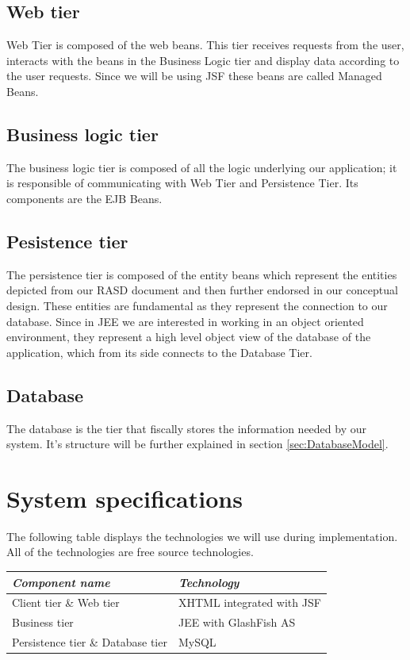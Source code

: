 \documentclass[10pt,a4paper,titlepage]{article}
\begin{document}
\subsection{Web tier}
Web Tier is composed of the web beans. This tier receives requests from the user, interacts with the beans in the Business Logic tier and display data according to the user requests. Since we will be using JSF these beans are called Managed Beans.

\subsection{Business logic tier}
The business logic tier is composed of all the logic underlying our application; it is responsible of communicating with Web Tier and Persistence Tier. Its components are the EJB Beans.

\subsection{Pesistence tier}
The persistence tier is composed of the entity beans which represent the entities depicted from our RASD document and then further endorsed in our conceptual design. These entities are fundamental as they represent the connection to our database. Since in JEE we are interested in working in an object oriented environment, they represent a high level object view of the database of the application, which from its side connects to the Database Tier.

\subsection{Database}
The database is the tier that fiscally stores the information needed by our system. It's structure will be further explained in section \ref{sec:DatabaseModel}.

\section{System specifications}
The following table displays the technologies we will use during implementation. All of the technologies are free source technologies.

\noindent\begin{tabular}{| l | l |}
\hline	\emph{Component name}	&	\emph{Technology}	\\
\hline	Client tier \& Web tier	&	XHTML integrated with JSF	\\
\hline	Business tier			&	JEE with GlashFish AS	\\
\hline	Persistence tier \& Database tier	&	MySQL	\\
\hline
\end{tabular}
\end{document}

